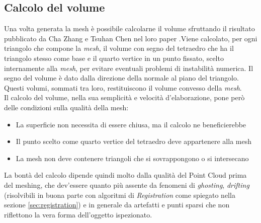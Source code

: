 \subsection{Calcolo del volume}
\label{sec:volume}
Una volta generata la mesh è possibile calcolarne il volume sfruttando il risultato pubblicato da Cha Zhang e Tsuhan Chen nel loro paper \cite{paper:volume} .Viene calcolato, per ogni triangolo che compone la \emph{mesh}, il volume con segno del tetraedro che ha il triangolo stesso come base e il quarto vertice in un punto fissato, scelto internamente alla \emph{mesh}, per evitare eventuali problemi di instabilità numerica. Il segno del volume è dato dalla direzione della normale al piano del triangolo. Questi volumi, sommati tra loro, restituiscono il volume convesso della \emph{mesh}.\\
Il calcolo del volume, nella sua semplicità e velocità d'elaborazione, pone però delle condizioni sulla qualità della mesh:
\begin{itemize}
\item La superficie non necessita di essere chiusa, ma il calcolo ne beneficierebbe
\item Il punto scelto come quarto vertice del tetraedro deve appartenere alla mesh
\item La mesh non deve contenere triangoli che si sovrappongono o si intersecano
\end{itemize}
La bontà del calcolo dipende quindi molto dalla qualità del Point Cloud prima del meshing, che dev'essere quanto più assente da fenomeni di \emph{ghosting}, \emph{drifting} (risolvibili in buona parte con algoritmi di \emph{Registration} come spiegato nella sezione \ref{sec:registration}) e in generale da artefatti e punti sparsi che non riflettono la vera forma dell'oggetto ispezionato.
